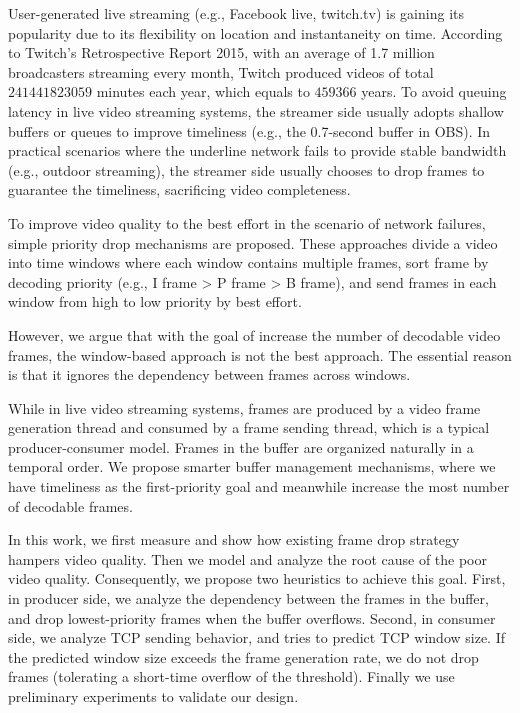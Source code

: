 User-generated live streaming (e.g., Facebook live, twitch.tv) is gaining its popularity due to its flexibility on location and instantaneity on time. According to Twitch's Retrospective Report 2015, with an average of 1.7 million broadcasters streaming every month, Twitch produced videos of total $241441823059$ minutes each year, which equals to $459366$ years. To avoid queuing latency in live video streaming systems, the streamer side usually adopts shallow buffers or queues to improve timeliness (e.g., the 0.7-second buffer in OBS). In practical scenarios where the underline network fails to provide stable bandwidth (e.g., outdoor streaming), the streamer side usually chooses to drop frames to guarantee the timeliness, sacrificing video completeness.

To improve video quality to the best effort in the scenario of network failures, simple priority drop mechanisms are proposed. These approaches divide a video into time windows where each window contains multiple frames, sort frame by decoding priority (e.g., I frame > P frame > B frame), and send frames in each window from high to low priority by best effort.

However, we argue that with the goal of increase the number of decodable video frames, the window-based approach is not the best approach. The essential reason is that it ignores the dependency between frames across windows.

While in live video streaming systems, frames are produced by a video frame generation thread and consumed by a frame sending thread, which is a typical producer-consumer model. Frames in the buffer are organized naturally in a temporal order. We propose smarter buffer management mechanisms, where we have timeliness as the first-priority goal and meanwhile increase the most number of decodable frames.

In this work, we first measure and show how existing frame drop strategy hampers video quality. Then we model and analyze the root cause of the poor video quality. Consequently, we propose two heuristics to achieve this goal. First, in producer side, we analyze the dependency between the frames in the buffer, and drop lowest-priority frames when the buffer overflows. Second, in consumer side, we analyze TCP sending behavior, and tries to predict TCP window size. If the predicted window size exceeds the frame generation rate, we do not drop frames (tolerating a short-time overflow of the threshold). Finally we use preliminary experiments to validate our design.


\fi



